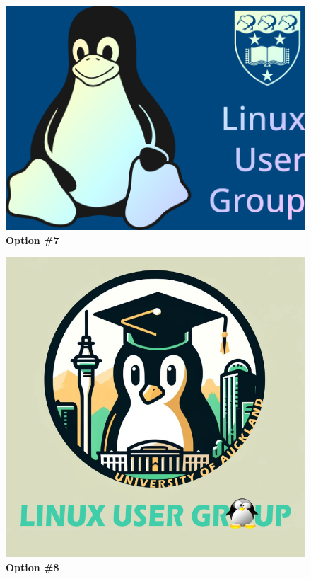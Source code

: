\documentclass[11pt,fleqn]{article}
\begin{document}
\begin{figure}
  \centering
  \includegraphics[width=0.56\linewidth]{res/7-lug-logo-blue.png}
  \caption*{\Large{\textbf{Option \#7}}}
  \label{fig:optn5}
\end{figure}

\begin{figure}
  \centering
  \includegraphics[width=0.56\linewidth]{res/8.png}
  \caption*{\Large{\textbf{Option \#8}}}
  \label{fig:optn5}
\end{figure}
\end{document}
